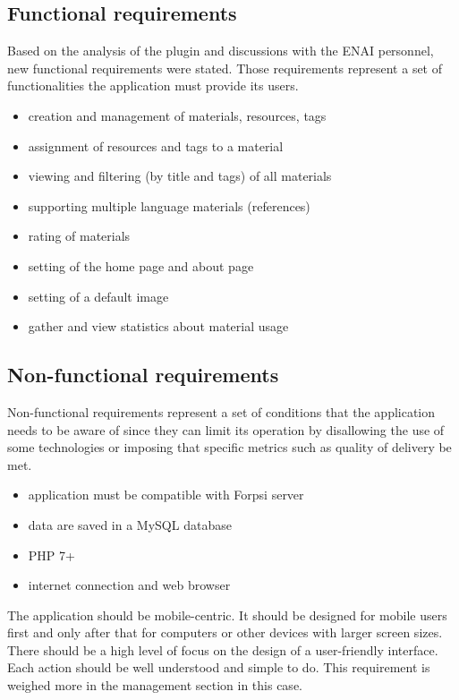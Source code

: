 \documentclass[
  digital,     %
  oneside,     %
  nosansbold,  %
  colorbold, %
  lof,         %
  lot,         %
]{fithesis4}
\begin{document}
\subsection{Functional requirements}

Based on the analysis of the plugin and discussions with the ENAI personnel, new functional requirements were stated. Those requirements represent a set of functionalities the application must provide its users.

\begin{itemize}
    \item creation and management of materials, resources, tags
    \item assignment of resources and tags to a material
    \item viewing and filtering (by title and tags) of all materials
    \item supporting multiple language materials (references)
    \item rating of materials
    \item setting of the home page and about page
    \item setting of a default image
    \item gather and view statistics about material usage
\end{itemize}

\subsection{Non-functional requirements}

Non-functional requirements represent a set of conditions that the application needs to be aware of since they can limit its operation by disallowing the use of some technologies or imposing that specific metrics such as quality of delivery be met.

\begin{itemize}
	\item application must be compatible with Forpsi server~\cite{forpsi_data}
	\item data are saved in a MySQL database
	\item PHP 7+
	\item internet connection and web browser
\end{itemize}

The application should be mobile-centric. It should be designed for mobile users first and only after that for computers or other devices with larger screen sizes. There should be a high level of focus on the design of a user-friendly interface. Each action should be well understood and simple to do. This requirement is weighed more in the management section in this case.
\end{document}
